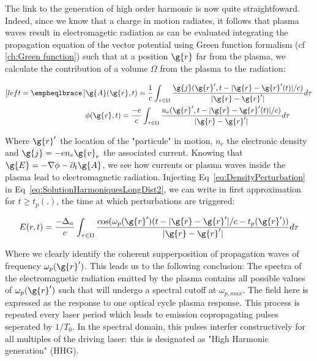 \noindent The link to the generation of high order harmonic is now quite straightfoward.
Indeed, since we know that a charge in motion radiates, it follows that plasma waves result in electromagetic radiation as can be evaluated integrating the propagation equation of the vector potential using Green function formalism (cf \ref{ch:Green function}) \cite{LandauLip} such that at a position $\g{r}$ far from the plasma, we calculate the contribution of a volume $\Omega$ from the plasma to the radiation:

\begin{subequations}
\label{eq:SolutionHarmoniquesLongDist}
\begin{align}[left = \empheqlbrace\,]
&\g{A}(\g{r},t) = \frac{1}{c} \int_{\tau \in \Omega}\frac{\g{j}(\g{r}',t-|\g{r}-\g{r}'(t)|/c)}{|\g{r}-\g{r}'|}d\tau \\
&\phi(\g{r},t) = \frac{-e}{c} \int_{\tau \in \Omega}\frac{n_e(\g{r}',t-|\g{r}-\g{r}'(t)|/c)}{|\g{r}-\g{r}'|}d\tau\label{eq:SolutionHarmoniquesLongDist2}
\end{align}
\end{subequations}

\noindent Where $\g{r}'$ the location of the "particule" in motion, $n_e$ the electronic density and $\g{j} = -en_e\g{v}_e$ the associated current. Knowing that $\g{E} = -\nabla \phi - \partial_t \g{A}$, we see how currents or plasma waves inside the plasma lead to electromagnetic radiation. Injecting Eq~\ref{eq:DensityPerturbation} in Eq~\ref{eq:SolutionHarmoniquesLongDist2}, we can write in first approximation for $t\ge t_p(.)$, the time at which perturbations are triggered:

$$
E(r,t) = \frac{-\Delta_n}{c} \int_{\tau \in \Omega}\frac{\cos(\omega_p(\g{r}')(t-|\g{r}-\g{r}'|/c-t_p(\g{r}'))}{|\g{r}-\g{r}'|}d\tau
$$

\noindent  Where we clearly identify the coherent supperposition of propagation waves of frequency $\omega_p(\g{r}')$. This leads us to the following conclusion: The spectra of the electromagnetic radiation emitted by the plasma contains all possible values of $\omega_p(\g{r}')$ such that  will undergo a spectral cutoff at $\omega_{p,max}$. The field here is expressed as the response to one optical cycle plasma response. This process is repeated every laser period which leads to emission copropagating pulses seperated by $1/T_0$. In the spectral domain, this pulses interfer constructively for all multiples of the driving laser: this is designated as "High Harmonic generation" (HHG).\\


